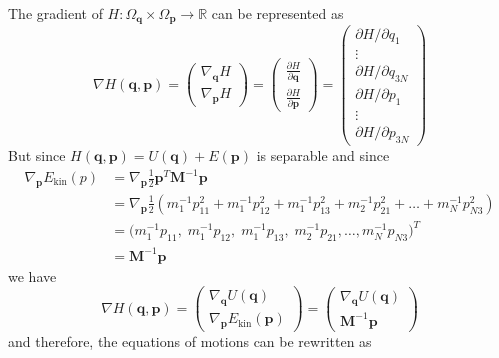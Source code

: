     The gradient of $H: \Omega_\mathbf{q} \times \Omega_\mathbf{p} \longrightarrow \mathbb{R}$ can be represented as 
    \begin{equation}
      \nabla H(\mathbf{q}, \mathbf{p}) = 
      \begin{pmatrix} \nabla_\mathbf{q} H \\[1mm] \nabla_\mathbf{p} H \end{pmatrix} =
      \begin{pmatrix} \frac{\partial H}{\partial \mathbf{q}} \\[2mm] \frac{\partial H}{\partial \mathbf{p}} \end{pmatrix} = 
      \begin{pmatrix} \partial H / \partial q_1 \\ \vdots \\ \partial H / \partial q_{3N} \\ \partial H / \partial p_1 \\ \vdots \\ \partial H / \partial p_{3N} \end{pmatrix}
    \end{equation}
    But since $H(\mathbf{q}, \mathbf{p}) = U(\mathbf{q}) + E (\mathbf{p})$ is separable and since 
    \begin{align*}
      \nabla_\mathbf{p} E_\mathrm{kin}(p) & = \nabla_\mathbf{p} \frac{1}{2} \mathbf{p}^T \mathbf{M}^{-1} \mathbf{p} \\
      & = \nabla_\mathbf{p} \frac{1}{2} (m_1^{-1} p_{11}^2 + m_1^{-1} p_{12}^2 + m_1^{-1} p_{13}^2 + m_2^{-1} p_{21}^2 + \ldots + m_N^{-1} p_{N3}^2) \\
      & = \big(m_1^{-1} p_{11}, \;m_1^{-1} p_{12}, \;m_1^{-1} p_{13}, \;m_2^{-1} p_{21}, \ldots, m_N^{-1} p_{N3} \big)^T \\
      & = \mathbf{M}^{-1} \mathbf{p} 
    \end{align*}
    we have 
    \begin{equation}
      \nabla H(\mathbf{q}, \mathbf{p}) = \begin{pmatrix} \nabla_\mathbf{q} U (\mathbf{q})\\ \nabla_\mathbf{p} E_\mathrm{kin} (\mathbf{p}) \end{pmatrix} = \begin{pmatrix} \nabla_\mathbf{q} U (\mathbf{q})\\ \mathbf{M}^{-1} \mathbf{p} \end{pmatrix} 
    \end{equation}
    and therefore, the equations of motions can be rewritten as 
